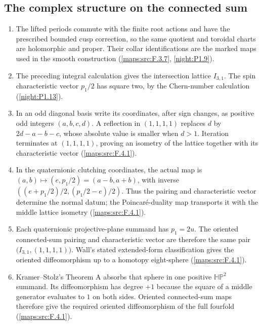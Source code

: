 \subsection{The complex structure on the connected sum}
\RungOne
\begin{enumerate}[label=\arabic*.]
\item The lifted periods commute with the finite root actions and
  have the prescribed bounded cusp correction, so the same quotient
  and toroidal charts are holomorphic and proper.  Their collar
  identifications are the marked maps used in the smooth construction
  (\cref{maps:src:F.3.7}, \cref{night:P1.9}).
\item The preceding integral calculation gives the intersection
  lattice $I_{3,1}$.  The spin characteristic vector $p_1/2$ has
  square two, by the Chern-number calculation
  (\cref{night:P1.13}).
\item In an odd diagonal basis write its coordinates, after sign
  changes, as positive odd integers $(a,b,c,d)$.  A reflection in
  $(1,1,1,1)$ replaces $d$ by $2d-a-b-c$, whose absolute value is
  smaller when $d>1$.  Iteration terminates at $(1,1,1,1)$, proving
  an isometry of the lattice together with its characteristic vector
  (\cref{maps:src:F.4.1}).
\item In the quaternionic clutching coordinates, the actual map is
  $(a,b)\mapsto(e,p_1/2)=(a-b,a+b)$, with inverse
  $((e+p_1/2)/2,(p_1/2-e)/2)$.  Thus the pairing and characteristic
  vector determine the normal datum; the Poincar\'e-duality map
  transports it with the middle lattice isometry
  (\cref{maps:src:F.4.1}).
\item Each quaternionic projective-plane summand has $p_1=2u$.
  The oriented connected-sum pairing and characteristic vector are
  therefore the same pair $\bigl(I_{3,1},(1,1,1,1)\bigr)$.
  Wall's stated extended-form classification gives the oriented
  diffeomorphism up to a homotopy eight-sphere
  (\cref{maps:src:F.4.1}).
\item Kramer--Stolz's Theorem A absorbs that sphere in one positive
  $\mathbb{HP}^2$ summand.  Its diffeomorphism has degree $+1$ because
  the square of a middle generator evaluates to $1$ on both sides.
  Oriented connected-sum maps therefore give the required oriented
  diffeomorphism of the full fourfold
  (\cref{maps:src:F.4.1}).
\end{enumerate}

